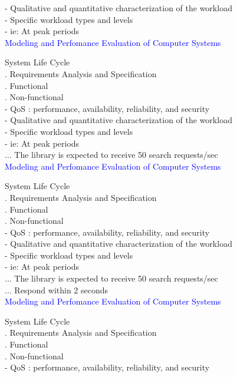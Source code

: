 \documentclass[svgnames]{beamer}
\begin{document}
- Qualitative and quantitative characterization of the workload \\
- Specific workload types and levels \\
- ie: At peak periods \\
\newpage
\textcolor{blue}{Modeling and Perfomance Evaluation of Computer Systems} \\[38pt]
\raggedright
\! System Life Cycle\\
. Requirements Analysis and Specification\\
. Functional\\
. Non-functional\\[20pt]
- QoS : performance, availability, reliability, and security\\
- Qualitative and quantitative characterization of the workload \\
- Specific workload types and levels \\
- ie: At peak periods \\
 ... The library is expected to receive 50 search requests/sec\\
\newpage
\textcolor{blue}{Modeling and Perfomance Evaluation of Computer Systems} \\[38pt]
\raggedright
\! System Life Cycle\\
. Requirements Analysis and Specification\\
. Functional\\
. Non-functional\\[20pt]
- QoS : performance, availability, reliability, and security\\
- Qualitative and quantitative characterization of the workload \\
- Specific workload types and levels \\
- ie: At peak periods \\
 ... The library is expected to receive 50 search requests/sec\\
 ... Respond within 2 seconds \\
\newpage
\textcolor{blue}{Modeling and Perfomance Evaluation of Computer Systems} \\[38pt]
\raggedright
\! System Life Cycle\\
. Requirements Analysis and Specification\\
. Functional\\
. Non-functional\\[20pt]
- QoS : performance, availability, reliability, and security\\
\end{document}
